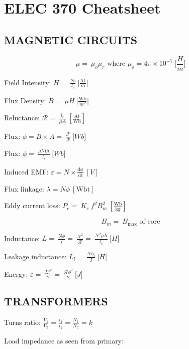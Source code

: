 \chapter{ELEC 370 Cheatsheet}

\begin{multicols}{2}
	\section{MAGNETIC CIRCUITS}
	
	\[\mu = \ \mu_{o}\mu_{r}\text{\ where\ }\mu_{o} = 4\pi \times 10^{- 7}\ \lbrack\frac{H}{m}\rbrack\]
	
	Field Intensity:
	\(H = \ \frac{\text{Ni}}{l_{c}}\ \lbrack\frac{\text{At}}{m}\rbrack\)
	
	Flux Density: \(B = \ \mu H\ \lbrack\frac{\text{Wb}}{m^{2}}\rbrack\)
	
	Reluctance:
	\(\mathcal{R = \ }\frac{l_{c}}{\mu A}\ \left\lbrack \frac{\text{At}}{\text{Wb}} \right\rbrack\)
	
	Flux:
	\(\phi = B \times A = \ \frac{\mathcal{F}}{\mathcal{R}}\ \lbrack Wb\rbrack\)
	
	Flux: \(\phi = \ \frac{\mu\text{NiA}}{l_{c}}\ \lbrack Wb\rbrack\)
	
	Induced EMF:
	\(\varepsilon = N \times \frac{\text{d}\phi}{\text{dt}}\ \left\lbrack V \right\rbrack\)
	
	Flux linkage: \(\lambda = N\phi\ \left\lbrack \text{Wbt} \right\rbrack\)
	
	Eddy current loss:
	\(P_{e} = \ K_{e}\ f^{2}B_{m}^{2}\ \left\lbrack \frac{\text{Wb}}{\text{kg}} \right\rbrack\)
	
	\[B_{m} = \ B_{\max}\text{\ of\ core}\]
	
	Inductance:
	\(L = \ \frac{\text{N}\phi}{I} = \ \frac{N^{2}}{\mathcal{R}} = \ \frac{N^{2}\mu\text{A}}{l_{c}}\ \lbrack H\rbrack\)
	
	Leakage inductance: \(L_{l} = \ \frac{N\phi_{l}}{I}\ \lbrack H\rbrack\)
	
	Energy:
	\(\varepsilon = \ \frac{Li^{2}}{2} = \ \frac{\mathcal{R}\phi^{2}}{2}\ \lbrack J\rbrack\)
	
	\section{TRANSFORMERS}
	
	Turns ratio:
	\(\frac{V_{1}}{V_{2}} = \frac{i_{1}}{i_{2}} = \frac{N_{1}}{N_{2}} = k\)
	
	Load impedance as seen from primary:
	

\end{multicols}
